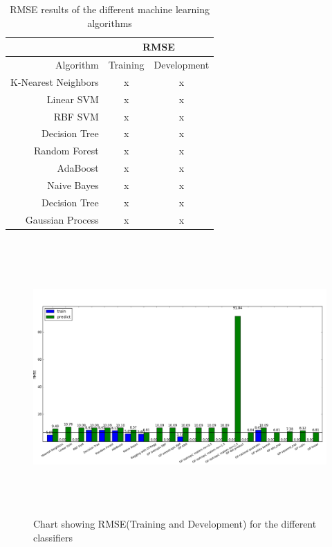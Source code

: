 \documentclass{article}
\begin{document}
	\begin{table}
		\begin{center}
			\begin{tabular}{ | r | c | c |}
			\hline
			& \multicolumn{2}{c|}{RMSE} \\ \hline
			Algorithm & Training & Development \\ \hline\hline
			K-Nearest Neighbors        & x & x \\ \hline
			Linear SVM                 & x & x \\ \hline
			RBF SVM                    & x & x \\ \hline
			Decision Tree              & x & x \\ \hline
			Random Forest              & x & x \\ \hline
			AdaBoost                   & x & x \\ \hline
			Naive Bayes                & x & x \\ \hline
			Decision Tree              & x & x \\ \hline
			Gaussian Process           & x & x \\ \hline
			\end{tabular}
		\end{center}
		\caption{RMSE results of the different machine learning algorithms}
		\label{rmse_results}
	\end{table}
 
	\begin{figure}
	\includegraphics[height=105mm, keepaspectratio]{results}
	\caption{Chart showing RMSE(Training and Development) for the different classifiers}
	\label{rmse_results_chart}
	\end{figure}
\end{document}
